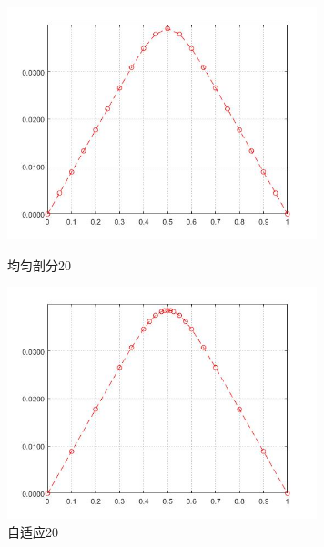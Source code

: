 \documentclass[12pt]{ctexart}
\begin{document}
\begin{figure}[H]
	\centering
	\begin{minipage}[t]{0.48\textwidth}
		\centering
		\includegraphics[width=9cm]{方程二，均匀剖分20.jpg}
		\caption{均匀剖分20}
	\end{minipage}
	\begin{minipage}[t]{0.48\textwidth}
		\centering
		\includegraphics[width=9cm]{方程二，自适应20.jpg}
		\caption{自适应20}
	\end{minipage}
\end{figure}
\end{document}
